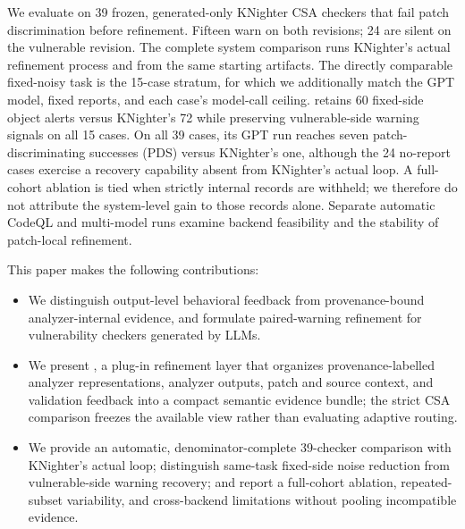 We evaluate \toolname on 39 frozen, generated-only KNighter CSA checkers that fail patch discrimination before refinement. Fifteen warn on both revisions; 24 are silent on the vulnerable revision. The complete system comparison runs KNighter's actual refinement process and \toolname from the same starting artifacts. The directly comparable fixed-noisy task is the 15-case stratum, for which we additionally match the GPT model, fixed reports, and each case's model-call ceiling. \toolname retains 60 fixed-side object alerts versus KNighter's 72 while preserving vulnerable-side warning signals on all 15 cases. On all 39 cases, its GPT run reaches seven patch-discriminating successes (PDS) versus KNighter's one, although the 24 no-report cases exercise a recovery capability absent from KNighter's actual loop. A full-cohort ablation is tied when strictly internal records are withheld; we therefore do not attribute the system-level gain to those records alone. Separate automatic CodeQL and multi-model runs examine backend feasibility and the stability of patch-local refinement.

This paper makes the following contributions:
\begin{itemize}
  \item We distinguish output-level behavioral feedback from provenance-bound analyzer-internal evidence, and formulate paired-warning refinement for vulnerability checkers generated by LLMs.
  \item We present \toolname, a plug-in refinement layer that organizes provenance-labelled analyzer representations, analyzer outputs, patch and source context, and validation feedback into a compact semantic evidence bundle; the strict CSA comparison freezes the available view rather than evaluating adaptive routing.
  \item We provide an automatic, denominator-complete 39-checker comparison with KNighter's actual loop; distinguish same-task fixed-side noise reduction from vulnerable-side warning recovery; and report a full-cohort ablation, repeated-subset variability, and cross-backend limitations without pooling incompatible evidence.
\end{itemize}
